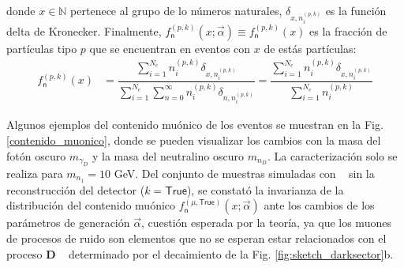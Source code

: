 donde $x\in\mathbb{N}$ pertenece al grupo de lo números naturales, $\delta_{x,n_i^{(p,k)}}$ es la función delta de Kronecker. %
Finalmente, $f^{(p, k)}_\textsf{n} (x; \vec{\alpha}) \equiv f^{(p, k)}_\textsf{n} (x)$ es la fracción de partículas tipo $p$ que se encuentran en eventos con $x$ de estás partículas:
\begin{eqnarray}\label{fn}
f^{(p, k)}_\textsf{n} (x) & = \dfrac{\sum\limits_{i=1}^{N_e} n_i^{(p,k)} \delta_{x,n_i^{(p,k)}}}{\sum\limits_{i=1}^{N_e} \sum\limits_{n=0}^\infty n_i^{(p,k)} \delta_{n, n_i^{(p,k)}}}  = \dfrac{\sum\limits_{i=1}^{N_e} n_i^{(p,k)} \delta_{x, n_i^{(p,k)}}}{\sum\limits_{i=1}^{N_e} n_i^{(p,k)}}
\end{eqnarray}


Algunos ejemplos del contenido muónico de los eventos se muestran en la Fig. \ref{contenido_muonico}, donde se pueden visualizar los cambios con la masa del fotón oscuro $m_{\gamma_D}$ y la masa del neutralino oscuro $m_{n_D}$. La caracterización solo se realiza para $m_{n_1}=10$ GeV. Del conjunto de muestras simuladas con \MC ~ sin la reconstrucción del detector ($k=\textsf{True}$), se constató la invarianza de la distribución del contenido muónico $f^{(\mu, \textsf{True})}_\textsf{n} (x; \vec{\alpha}) $ ante los cambios de los parámetros de generación $\vec{\alpha}$, cuestión esperada por la teoría, ya que los muones de procesos de ruido son elementos que no se esperan estar relacionados con el proceso \MSSM\textbf{D} ~ determinado por el decaimiento de la Fig. \ref{fig:sketch_darksector}b.

